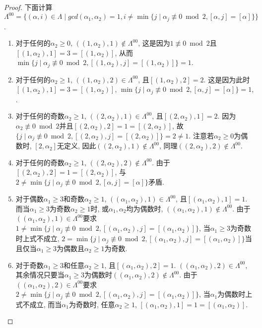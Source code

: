 \begin{proof}
下面计算$\Lambda^{00}=\big\{(\alpha, i)\in \Lambda\mid  gcd(\alpha_1, \alpha_2)=1, i\neq \min\{j\mid \alpha_j\not\equiv 0 \bmod 2, [\alpha, j]=[\alpha]\} \big\}$.
\begin{enumerate}
	\item 对于任何的$\alpha_2\geq 0$, $((1, \alpha_2), 1) \not \in \Lambda^{00}$, 这是因为$1\not\equiv 0 \bmod 2$且$[(1, \alpha_2), 1]=3=[(1, \alpha_2)]$, 从而$\min\{j\mid \alpha_j\not\equiv 0 \bmod 2, [(1, \alpha_2), j]=[(1, \alpha_2)]\}=1$.
	\item 对于任何的$\alpha_2\geq 1$, $((1, \alpha_2), 2) \in \Lambda^{00}$, 且$[(1, \alpha_2), 2]=2$. 这是因为此时$[(1, \alpha_2), 1]=3=[(1, \alpha_2)]$, $\min\{j\mid \alpha_j\not\equiv 0 \bmod 2, [\alpha, j]=[\alpha]\}=1$, .
	\item 对于任何的奇数$\alpha_2\geq 1$, $((2, \alpha_2), 1) \in \Lambda^{00}$, 且$[(2, \alpha_2), 1]=2$. 因为$\alpha_2\not\equiv 0 \bmod 2$并且$[(2, \alpha_2), 2]=1=[(2, \alpha_2)]$, 故$\{j\mid \alpha_j\not\equiv 0 \bmod 2, [(2, \alpha_2), j]=[(2, \alpha_2)]\}=2\neq 1$. 注意若$\alpha_2\geq 0$为偶数时, $[2,\alpha_2]$无定义, 因此$((2, \alpha_2), 1) \not \in \Lambda^{00}$, 同理$((2, \alpha_2), 2) \not \in \Lambda^{00}$.
	\item 对于任何的奇数$\alpha_2\geq 1$, $((2, \alpha_2), 2) \not \in \Lambda^{00}$. 由于$[(2, \alpha_2), 2]=1=[(2, \alpha_2)]$, 与$2\neq \min\{j\mid \alpha_j\not\equiv 0 \bmod 2, [\alpha, j]=[\alpha]\}$矛盾.
	\item 对于偶数$\alpha_1\geq 3$和奇数$\alpha_2\geq 1$, $((\alpha_1, \alpha_2), 1)  \in \Lambda^{00}$, 且$[(\alpha_1, \alpha_2), 1]=1$. 而当$\alpha_1\geq 3$为奇数$\alpha_2\geq 1$时, 或$\alpha_1, \alpha_2$均为偶数时, $((\alpha_1, \alpha_2), 1) \not  \in \Lambda^{00}$. 由于$((\alpha_1, \alpha_2), 1)  \in \Lambda^{00}$要求$1\neq \min\{j\mid \alpha_j\not\equiv 0 \bmod 2, [(\alpha_1, \alpha_2), j]=[(\alpha_1, \alpha_2)]\}$, 当$\alpha_1\geq 3$为奇数时上式不成立, $2= \min\{j\mid \alpha_j\not\equiv 0 \bmod 2, [(\alpha_1, \alpha_2), j]=[(\alpha_1, \alpha_2)]\}$当且仅当$\alpha_1\geq 3$为偶数且$\alpha_2\geq 1$为奇数.
	\item 对于奇数$\alpha_1\geq 3$和任意$\alpha_2\geq 1 $, 且$[(\alpha_1, \alpha_2), 2]=1$. $((\alpha_1, \alpha_2), 2)  \in \Lambda^{00}$, 其余情况只要当$\alpha_1\geq 3$为偶数时$((\alpha_1, \alpha_2), 2) \not  \in \Lambda^{00}$. 由于$((\alpha_1, \alpha_2), 2)  \in \Lambda^{00}$要求$2\neq \min\{j\mid \alpha_j\not\equiv 0 \bmod 2, [(\alpha_1, \alpha_2), j]=[(\alpha_1, \alpha_2)]\}$, 当$\alpha_1$为偶数时上式不成立, 而当$\alpha_1$为奇数时, 任意$\alpha_2\geq 1$, $[(\alpha_1, \alpha_2), 1]=1=[(\alpha_1, \alpha_2)]$. 
\end{enumerate}




\end{proof}
